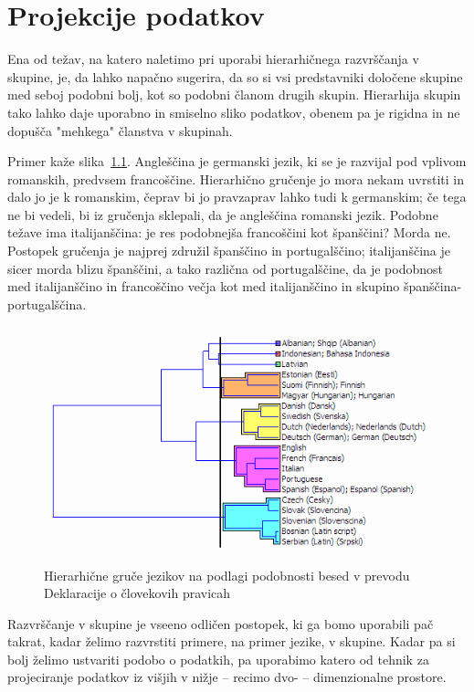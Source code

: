 \chapter{Projekcije podatkov}

Ena od težav, na katero naletimo pri uporabi hierarhičnega razvrščanja v skupine, je, da lahko napačno sugerira, da so si vsi predstavniki določene skupine med seboj podobni bolj, kot so podobni članom drugih skupin. Hierarhija skupin tako lahko daje uporabno in smiselno sliko podatkov, obenem pa je rigidna in ne dopušča "mehkega" članstva v skupinah.

Primer kaže slika~\ref{f-jeziki-hclust}. Angleščina je germanski jezik, ki se je razvijal pod vplivom romanskih, predvsem francoščine. Hierarhično gručenje jo mora nekam uvrstiti in dalo jo je k romanskim, čeprav bi jo pravzaprav lahko tudi k germanskim; če tega ne bi vedeli, bi iz gručenja sklepali, da je angleščina romanski jezik. Podobne težave ima italijanščina: je res podobnejša francoščini kot španščini? Morda ne. Postopek gručenja je najprej združil španščino in portugalščino; italijanščina je sicer morda blizu španščini, a tako različna od portugalščine, da je podobnost med italijanščino in francoščino večja kot med italijanščino in skupino španščina-portugalščina.

\begin{figure}[b!]
\begin{center}
\includegraphics[width=12cm]{slike/jeziki-clustering.png}
\caption{Hierarhične gruče jezikov na podlagi podobnosti besed v prevodu Deklaracije o človekovih pravicah}
\label{f-jeziki-hclust}
\end{center}
\end{figure}

Razvrščanje v skupine je vseeno odličen postopek, ki ga bomo uporabili pač takrat, kadar želimo razvrstiti primere, na primer jezike, v skupine. Kadar pa si bolj želimo ustvariti podobo o podatkih, pa uporabimo katero od tehnik za projeciranje podatkov iz višjih v nižje -- recimo dvo- -- dimenzionalne prostore.

